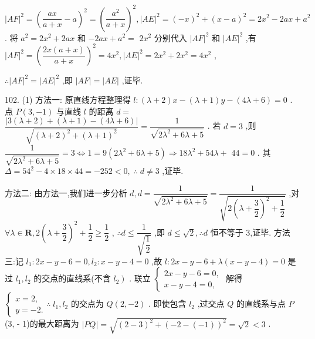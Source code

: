 ${\left| AF\right| }^{2} = {\left( \dfrac{ax}{a + x} - a\right) }^{2} = {\left( \dfrac{{a}^{2}}{a + x}\right) }^{2},{\left| AE\right| }^{2} = {\left( -x\right) }^{2} + {\left( x - a\right) }^{2} = 2{x}^{2} - {2ax} + {a}^{2}$ . 将 ${a}^{2} = 2{x}^{2} + {2ax}$ 和 $- {2ax} + {a}^{2} =$  $2{x}^{2}$ 分别代入 ${\left| AF\right| }^{2}$ 和 ${\left| AE\right| }^{2}$ ,有 ${\left| AF\right| }^{2} = {\left( \dfrac{{2x}\left( {a + x}\right) }{a + x}\right) }^{2} = 4{x}^{2},{\left| AE\right| }^{2} = 2{x}^{2} + 2{x}^{2} = 4{x}^{2}$ ,

$\therefore {\left| AF\right| }^{2} = {\left| AE\right| }^{2}$ ,即 $\left| {AF}\right|  = \left| {AE}\right|$ ,证毕.

102. (1) 方法一: 原直线方程整理得 $l : \left( {\lambda  + 2}\right) x - \left( {\lambda  + 1}\right) y - \left( {{4\lambda } + 6}\right)  = 0$ . 点 $P\left( {3, - 1}\right)$ 与直线 $l$ 的距离 $d =$  $\dfrac{\left| 3\left( \lambda  + 2\right)  + \left( \lambda  + 1\right)  - \left( 4\lambda  + 6\right) \right| }{\sqrt{{\left( \lambda  + 2\right) }^{2} + {\left( \lambda  + 1\right) }^{2}}} = \dfrac{1}{\sqrt{2{\lambda }^{2} + {6\lambda } + 5}}$ . 若 $d = 3$ ,则 $\dfrac{1}{\sqrt{2{\lambda }^{2} + {6\lambda } + 5}} = 3 \Leftrightarrow  1 = 9\left( {2{\lambda }^{2} + {6\lambda } + 5}\right)  \Rightarrow  {18}{\lambda }^{2} + {54\lambda } +$  ${44} = 0$ . 其 $\Delta  = {54}^{2} - 4 \times  {18} \times  {44} =  - {252} < 0,\;\therefore \;d \neq  3$ ,证毕.

方法二: 由方法一,我们进一步分析 $d,d = \dfrac{1}{\sqrt{2{\lambda }^{2} + {6\lambda } + 5}} = \dfrac{1}{\sqrt{2{\left( \lambda  + \dfrac{3}{2}\right) }^{2} + \dfrac{1}{2}}}$ ,对 $\forall \lambda  \in  \mathbf{R},2{\left( \lambda  + \dfrac{3}{2}\right) }^{2} + \dfrac{1}{2} \geq  \dfrac{1}{2}$ , $\therefore d \leq  \dfrac{1}{\sqrt{\dfrac{1}{2}}}$ ,即 $d \leq  \sqrt{2},\therefore d$ 恒不等于 3,证毕. 方法三:记 ${l}_{1} : {2x} - y - 6 = 0,{l}_{2} : x - y - 4 = 0$ ,故 $l : {2x} - y - 6 + \lambda \left( {x - y - 4}\right)  = 0$ 是过 ${l}_{1},{l}_{2}$ 的交点的直线系(不含 $\left. {l}_{2}\right)$ . 联立 $\left\{  \begin{array}{l} {2x} - y - 6 = 0, \\  x - y - 4 = 0, \end{array}\right.$ 解得 $\left\{  {\begin{array}{l} x = 2, \\  y =  - 2. \end{array}\therefore }\right. \;{l}_{1},{l}_{2}$ 的交点为 $Q\left( {2, - 2}\right)$ . 即使包含 ${l}_{2}$ ,过交点 $Q$ 的直线系与点 $P$ (3, - 1)的最大距离为 $\left| {PQ}\right|  = \sqrt{{\left( 2 - 3\right) }^{2} + {\left( -2 - \left( -1\right) \right) }^{2}} = \sqrt{2} < 3$ .

